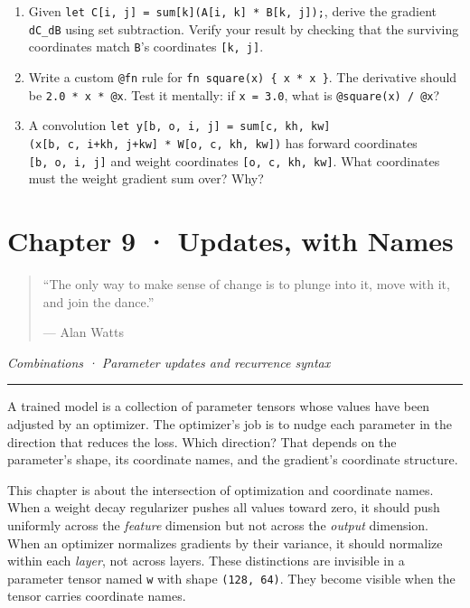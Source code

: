 \documentclass[11pt,]{article}
\begin{document}
\begin{enumerate}
\def\labelenumi{\arabic{enumi}.}
\item
  Given
  \texttt{let\ C{[}i,\ j{]}\ =\ sum{[}k{]}(A{[}i,\ k{]}\ *\ B{[}k,\ j{]});},
  derive the gradient \texttt{dC\_dB} using set subtraction. Verify your
  result by checking that the surviving coordinates match \texttt{B}'s
  coordinates \texttt{{[}k,\ j{]}}.
\item
  Write a custom \texttt{@fn} rule for
  \texttt{fn\ square(x)\ \{\ x\ *\ x\ \}}. The derivative should be
  \texttt{2.0\ *\ x\ *\ @x}. Test it mentally: if \texttt{x\ =\ 3.0},
  what is \texttt{@square(x)\ /\ @x}?
\item
  A convolution
  \texttt{let\ y{[}b,\ o,\ i,\ j{]}\ =\ sum{[}c,\ kh,\ kw{]}(x{[}b,\ c,\ i+kh,\ j+kw{]}\ *\ W{[}o,\ c,\ kh,\ kw{]})}
  has forward coordinates \texttt{{[}b,\ o,\ i,\ j{]}} and weight
  coordinates \texttt{{[}o,\ c,\ kh,\ kw{]}}. What coordinates must the
  weight gradient sum over? Why?
\end{enumerate}

\newpage

\hypertarget{chapter-9-updates-with-names}{%
\section{Chapter 9 · Updates, with
Names}\label{chapter-9-updates-with-names}}

\begin{quote}
``The only way to make sense of change is to plunge into it, move with
it, and join the dance.''

--- Alan Watts
\end{quote}

\emph{Combinations · Parameter updates and recurrence syntax}

\begin{center}\rule{0.5\linewidth}{0.4pt}\end{center}

A trained model is a collection of parameter tensors whose values have
been adjusted by an optimizer. The optimizer's job is to nudge each
parameter in the direction that reduces the loss. Which direction? That
depends on the parameter's shape, its coordinate names, and the
gradient's coordinate structure.

This chapter is about the intersection of optimization and coordinate
names. When a weight decay regularizer pushes all values toward zero, it
should push uniformly across the \emph{feature} dimension but not across
the \emph{output} dimension. When an optimizer normalizes gradients by
their variance, it should normalize within each \emph{layer}, not across
layers. These distinctions are invisible in a parameter tensor named
\texttt{w} with shape \texttt{(128,\ 64)}. They become visible when the
tensor carries coordinate names.
\end{document}
